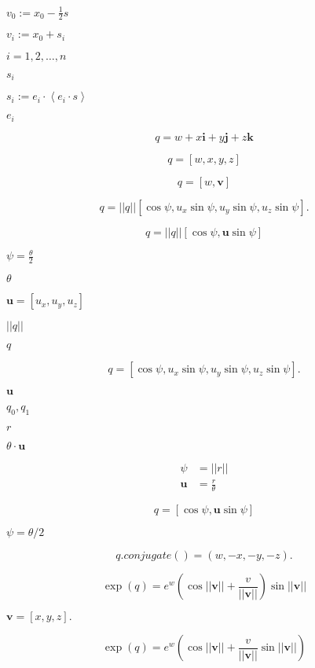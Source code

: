 \documentclass{article}
\begin{document}
$v_0:=x_0-\frac{1}{2} s$
\pagebreak

$v_i:=x_0+s_i$
\pagebreak

$i=1,2,\dots,n$
\pagebreak

$s_i$
\pagebreak

$s_i:=e_i\cdot\left<e_i\cdot s\right>$
\pagebreak

$e_i$
\pagebreak

\[q = w + x\boldsymbol{i} + y\boldsymbol{j} + z\boldsymbol{k}\]
\pagebreak

\[q = [w, x, y, z]\]
\pagebreak

\[q = [w, \boldsymbol{v}] \]
\pagebreak

\[q = ||q||[\cos\psi, u_x\sin\psi,u_y\sin\psi, u_z\sin\psi].\]
\pagebreak

\[q = ||q||[\cos\psi, \boldsymbol{u}\sin\psi]\]
\pagebreak

$\psi = \frac{\theta}{2}$
\pagebreak

$\theta$
\pagebreak

$\boldsymbol{u} = [u_x, u_y, u_z]$
\pagebreak

$||q||$
\pagebreak

$q$
\pagebreak

\[q = [\cos\psi, u_x\sin\psi,u_y\sin\psi, u_z\sin\psi].\]
\pagebreak

$\boldsymbol{u}$
\pagebreak

$q_0, q_1$
\pagebreak

$r$
\pagebreak

$\theta \cdot \boldsymbol{u}$
\pagebreak

\[ \begin{equation} \begin{split} \psi &= ||r||\\ \boldsymbol{u} &= \frac{r}{\theta} \end{split} \end{equation} \]
\pagebreak

\[q = [\cos\psi, \boldsymbol{u}\sin\psi]\]
\pagebreak

$\psi = \theta / 2 $
\pagebreak

\[q.conjugate() = (w, -x, -y, -z).\]
\pagebreak

\[\exp(q) = e^w (\cos||\boldsymbol{v}||+ \frac{v}{||\boldsymbol{v}||})\sin||\boldsymbol{v}||\]
\pagebreak

$\boldsymbol{v} = [x, y, z].$
\pagebreak

\[\exp(q) = e^w (\cos||\boldsymbol{v}||+ \frac{v}{||\boldsymbol{v}||}\sin||\boldsymbol{v}||)\]
\pagebreak
\end{document}
